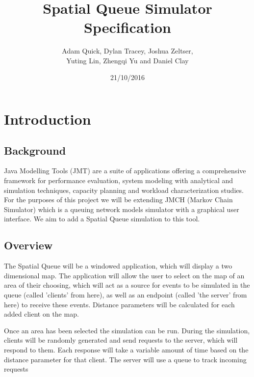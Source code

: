 \documentclass[a4paper]{article}
\begin{document}
\title{Spatial Queue Simulator Specification}
\date{21/10/2016}
\author{Adam Quick, Dylan Tracey, Joshua Zeltser, \\Yuting Lin, Zhengqi Yu and Daniel Clay}
\maketitle

\tableofcontents

\newpage
\section{Introduction}

\subsection{Background}%

Java Modelling Tools (JMT) are a suite of applications offering a comprehensive framework for performance evaluation, system modeling with analytical and simulation techniques, capacity planning and workload characterization studies. For the purposes of this project we will be extending JMCH (Markov Chain Simulator) which is a queuing network models simulator with a graphical user interface. We aim to add a Spatial Queue simulation to this tool.

\subsection{Overview}%

The Spatial Queue will be a windowed application, which will display a two dimensional map. The application will allow the user to select on the map of an area of their choosing, which will act as a source for events to be simulated in the queue (called 'clients' from here), as well as an endpoint (called 'the server' from here) to receive these events. Distance parameters will be calculated for each added client on the map. 

Once an area has been selected the simulation can be run. During the simulation, clients will be randomly generated and send requests to the server, which will respond to them. Each response will take a variable amount of time based on the distance parameter for that client. The server will use a queue to track incoming requests
\end{document}
